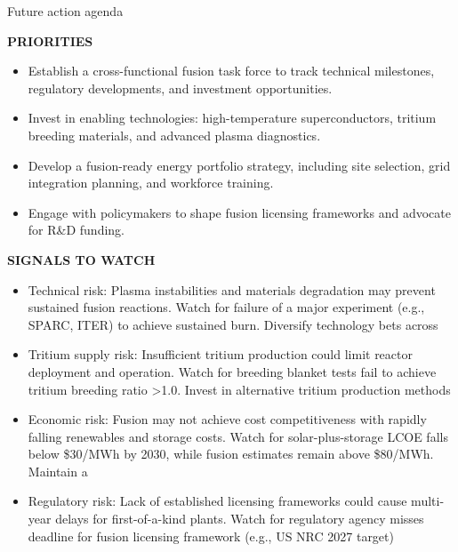 \documentclass[10pt,a4paper]{article}
\begin{document}
\clearpage
{\sffamily\fontsize{21}{26}\selectfont\color{BONavy} Future action agenda}\par\vspace{7pt}
\begin{minipage}[t]{0.47\linewidth}
{\textcolor{BOGreen}{\scriptsize\bfseries PRIORITIES}}\par\vspace{3pt}
{\small\begin{itemize}
\item Establish a cross-functional fusion task force to track technical milestones, regulatory developments, and investment opportunities.
\item Invest in enabling technologies: high-temperature superconductors, tritium breeding materials, and advanced plasma diagnostics.
\item Develop a fusion-ready energy portfolio strategy, including site selection, grid integration planning, and workforce training.
\item Engage with policymakers to shape fusion licensing frameworks and advocate for R\&D funding.
\end{itemize}}
\end{minipage}\hfill\begin{minipage}[t]{0.45\linewidth}
{\textcolor{BOGreen}{\scriptsize\bfseries SIGNALS TO WATCH}}\par\vspace{3pt}
{\small\begin{itemize}
\item Technical risk: Plasma instabilities and materials degradation may prevent sustained fusion reactions. Watch for failure of a major experiment (e.g., SPARC, ITER) to achieve sustained burn. Diversify technology bets across
\item Tritium supply risk: Insufficient tritium production could limit reactor deployment and operation. Watch for breeding blanket tests fail to achieve tritium breeding ratio >1.0. Invest in alternative tritium production methods
\item Economic risk: Fusion may not achieve cost competitiveness with rapidly falling renewables and storage costs. Watch for solar-plus-storage LCOE falls below \$30/MWh by 2030, while fusion estimates remain above \$80/MWh. Maintain a
\item Regulatory risk: Lack of established licensing frameworks could cause multi-year delays for first-of-a-kind plants. Watch for regulatory agency misses deadline for fusion licensing framework (e.g., US NRC 2027 target)
\end{itemize}}
\end{minipage}
\end{document}
